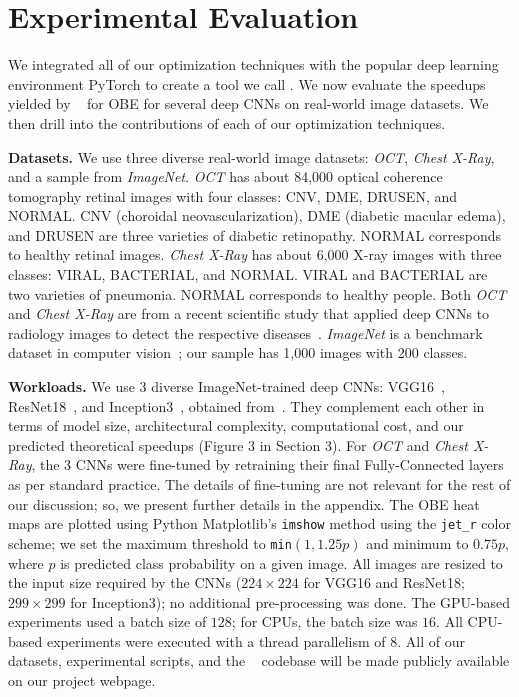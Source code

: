 \section{Experimental Evaluation}
We integrated all of our optimization techniques with the popular deep learning environment PyTorch to create a tool we call \system.
We now evaluate the speedups yielded by \system~ for OBE for several deep CNNs on real-world image datasets.
We then drill into the contributions of each of our optimization techniques.

\vspace{2mm}
\noindent \textbf{Datasets.}
We use three diverse real-world image datasets: \textit{OCT}, \textit{Chest X-Ray}, and a sample from \textit{ImageNet}. \textit{OCT} has about 84,000 optical coherence tomography retinal images with four classes: CNV, DME, DRUSEN, and NORMAL. CNV (choroidal neovascularization), DME (diabetic macular edema), and DRUSEN are three varieties of diabetic retinopathy. NORMAL corresponds to healthy retinal images. \textit{Chest X-Ray} has about 6,000 X-ray images with three classes: VIRAL, BACTERIAL, and NORMAL. VIRAL and BACTERIAL are two varieties of pneumonia. NORMAL corresponds to healthy people. Both \textit{OCT} and \textit{Chest X-Ray} are from a recent scientific study that applied deep CNNs to radiology images to detect the respective diseases~\cite{kermany2018identifying}. \textit{ImageNet} is a benchmark dataset in computer vision~\cite{deng2009imagenet}; our sample has 1,000 images with 200 classes.

\vspace{2mm}
\noindent \textbf{Workloads.}
We use 3 diverse ImageNet-trained deep CNNs: VGG16~\cite{vggnet}, ResNet18~\cite{resnet}, and Inception3~\cite{inception}, obtained from~\cite{torchvisionmodels}. They complement each other in terms of model size, architectural complexity, computational cost, and our predicted theoretical speedups (Figure 3 in Section 3). For \textit{OCT} and \textit{Chest X-Ray}, the 3 CNNs were fine-tuned by retraining their final Fully-Connected layers as per standard practice. The details of fine-tuning are not relevant for the rest of our discussion; so, we present further details in the appendix. The OBE heat maps are plotted using Python Matplotlib's \texttt{imshow} method using the \texttt{jet\_r} color scheme; we set the maximum threshold to \texttt{min}$(1, 1.25 p)$ and minimum to $0.75 p$, where $p$ is predicted class probability on a given image. All images are resized to the input size required by the CNNs ($224\times224$ for VGG16 and ResNet18; $299\times299$ for Inception3); no additional pre-processing was done. The GPU-based experiments used a batch size of $128$; for CPUs, the batch size was $16$. All CPU-based experiments were executed with a thread parallelism of $8$. All of our datasets, experimental scripts, and the \system~ codebase will be made publicly available on our project webpage.

